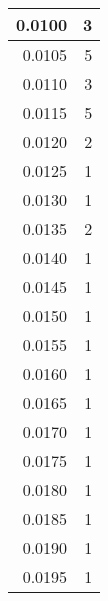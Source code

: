 \begin{tabular}{|r|r|}
           0.0100 &                    3 \\ \hline

           0.0105 &                    5 \\ \hline

           0.0110 &                    3 \\ \hline

           0.0115 &                    5 \\ \hline

           0.0120 &                    2 \\ \hline

           0.0125 &                    1 \\ \hline

           0.0130 &                    1 \\ \hline

           0.0135 &                    2 \\ \hline

           0.0140 &                    1 \\ \hline

           0.0145 &                    1 \\ \hline

           0.0150 &                    1 \\ \hline

           0.0155 &                    1 \\ \hline

           0.0160 &                    1 \\ \hline

           0.0165 &                    1 \\ \hline

           0.0170 &                    1 \\ \hline

           0.0175 &                    1 \\ \hline

           0.0180 &                    1 \\ \hline

           0.0185 &                    1 \\ \hline

           0.0190 &                    1 \\ \hline

           0.0195 &                    1 \\ \hline


\end{tabular}
